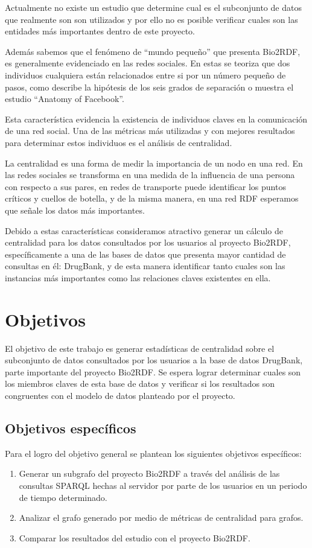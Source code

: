 Actualmente no existe un estudio que determine cual es el subconjunto de datos
que realmente son son utilizados y por ello no es posible verificar cuales son
las entidades más importantes dentro de este proyecto.

Además sabemos que el fenómeno de ``mundo pequeño'' que presenta Bio2RDF, es
generalmente evidenciado en las redes sociales. En estas se 
teoriza que dos individuos cualquiera están relacionados entre si por un número
pequeño de pasos, como describe la hipótesis de los seis grados de separación o
muestra el estudio ``Anatomy of Facebook''\cite{ugander2011anatomy}.

Esta característica evidencia la existencia de individuos claves en la
comunicación de una red social. 
Una de las métricas más utilizadas y con mejores resultados para determinar
estos individuos es el análisis de centralidad.

La centralidad es una forma de medir la importancia de un nodo en una red.
En las redes sociales se transforma en una medida de la influencia de una
persona con respecto a sus pares, en redes de transporte puede identificar los
puntos críticos y cuellos de botella, y de la misma manera, en una red RDF
esperamos que señale los datos más importantes.

Debido a estas características consideramos atractivo generar un cálculo de
centralidad para los datos consultados por los usuarios al proyecto Bio2RDF,
específicamente a una de las bases de datos que presenta mayor cantidad de
consultas en él: DrugBank, y de esta manera identificar tanto cuales son las
instancias más importantes como las relaciones claves existentes en ella.

\section{Objetivos}

El objetivo de este trabajo es generar estadísticas de centralidad sobre el
subconjunto de datos consultados por los usuarios a la base de datos DrugBank,
parte importante del proyecto Bio2RDF.
Se espera lograr determinar cuales son los miembros claves de esta base de datos
y verificar si los resultados son congruentes con el modelo de datos planteado
por el proyecto.

\subsection{Objetivos específicos}
Para el logro del objetivo general se plantean los siguientes objetivos
específicos:
\begin{enumerate}
  \item
    Generar un subgrafo del proyecto Bio2RDF a través del análisis de las
    consultas SPARQL hechas al servidor por parte de los usuarios en un periodo
    de tiempo determinado.
  \item
    Analizar el grafo generado por medio de métricas de centralidad para grafos.
  \item
    Comparar los resultados del estudio con el proyecto Bio2RDF.
\end{enumerate}
